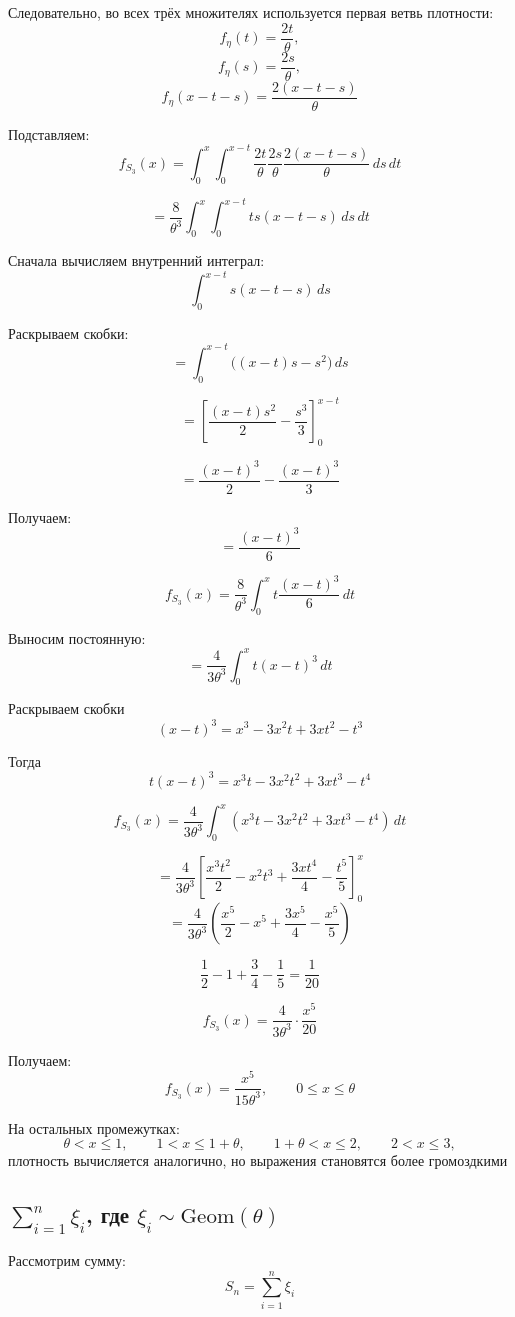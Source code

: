 \documentclass[12pt,a4paper]{article}
\theoremstyle{definition}
\begin{document}
Следовательно, во всех трёх множителях используется первая ветвь плотности:
\[f_\eta(t)=\frac{2t}{\theta},\]
\[f_\eta(s)=\frac{2s}{\theta},\]
\[f_\eta(x-t-s)=\frac{2(x-t-s)}{\theta}\]

Подставляем:
\[f_{S_3}(x)
=
\int_0^x
\int_0^{x-t}
\frac{2t}{\theta}
\frac{2s}{\theta}
\frac{2(x-t-s)}{\theta}
\,ds\,dt\]

\[=
\frac8{\theta^3}
\int_0^x
\int_0^{x-t}
ts(x-t-s)
\,ds\,dt\]

Сначала вычисляем внутренний интеграл:
\[\int_0^{x-t}s(x-t-s)\,ds\]

Раскрываем скобки:
\[=\int_0^{x-t}\bigl((x-t)s-s^2\bigr)\,ds\]

\[=\left[\frac{(x-t)s^2}{2}
-\frac{s^3}{3}\right]_0^{x-t}\]

\[=\frac{(x-t)^3}{2}
-\frac{(x-t)^3}{3}\]

Получаем:
\[=\frac{(x-t)^3}{6}\]

\[f_{S_3}(x)
=\frac8{\theta^3}\int_0^xt\frac{(x-t)^3}{6}\,dt\]

Выносим постоянную:
\[=\frac4{3\theta^3}\int_0^x
t(x-t)^3\,dt\]

Раскрываем скобки
\[(x-t)^3
=
x^3-3x^2t+3xt^2-t^3\]

Тогда
\[t(x-t)^3
=
x^3t-3x^2t^2+3xt^3-t^4\]

\[f_{S_3}(x)
=\frac4{3\theta^3}\int_0^x
\left(
x^3t-3x^2t^2+3xt^3-t^4\right)\,dt\]

\[=\frac4{3\theta^3}\left[
\frac{x^3t^2}{2}
-x^2t^3
+\frac{3xt^4}{4}
-\frac{t^5}{5}\right]_0^x\]
\[=\frac4{3\theta^3}
\left(
\frac{x^5}{2}
-x^5+\frac{3x^5}{4}
-\frac{x^5}{5}\right)\]

\[\frac12-1+\frac34-\frac15=\frac1{20}\]

\[f_{S_3}(x)=\frac4{3\theta^3}\cdot\frac{x^5}{20}\]

Получаем:\[\boxed{
f_{S_3}(x)
=
\frac{x^5}{15\theta^3},
\qquad 0\le x\le\theta}\]

На остальных промежутках:
\[\theta<x\le1,\qquad
1<x\le1+\theta,\qquad
1+\theta<x\le2,\qquad
2<x\le3,\]
плотность вычисляется аналогично, но выражения становятся более громоздкими

\subsection{\texorpdfstring
{$\sum_{i=1}^{n}\xi_i$, где $\xi_i\sim \mathrm{Geom}(\theta)$}
{sum xi_i, где xi_i ~ Geom(theta)}}

Рассмотрим сумму:
\[S_n=\sum_{i=1}^{n}\xi_i\]
\end{document}
